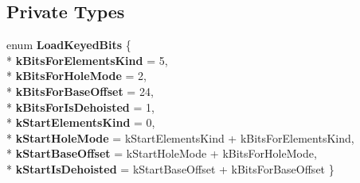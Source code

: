 \subsection*{Private Types}
\begin{DoxyCompactItemize}
\item 
enum {\bfseries Load\+Keyed\+Bits} \{ \\*
{\bfseries k\+Bits\+For\+Elements\+Kind} = 5, 
\\*
{\bfseries k\+Bits\+For\+Hole\+Mode} = 2, 
\\*
{\bfseries k\+Bits\+For\+Base\+Offset} = 24, 
\\*
{\bfseries k\+Bits\+For\+Is\+Dehoisted} = 1, 
\\*
{\bfseries k\+Start\+Elements\+Kind} = 0, 
\\*
{\bfseries k\+Start\+Hole\+Mode} = k\+Start\+Elements\+Kind + k\+Bits\+For\+Elements\+Kind, 
\\*
{\bfseries k\+Start\+Base\+Offset} = k\+Start\+Hole\+Mode + k\+Bits\+For\+Hole\+Mode, 
\\*
{\bfseries k\+Start\+Is\+Dehoisted} = k\+Start\+Base\+Offset + k\+Bits\+For\+Base\+Offset
 \}\hypertarget{classv8_1_1internal_1_1_h_load_keyed_ad8ac93bf6aeb87db5c86ef10d73819ef}{}\label{classv8_1_1internal_1_1_h_load_keyed_ad8ac93bf6aeb87db5c86ef10d73819ef}

\end{DoxyCompactItemize}
